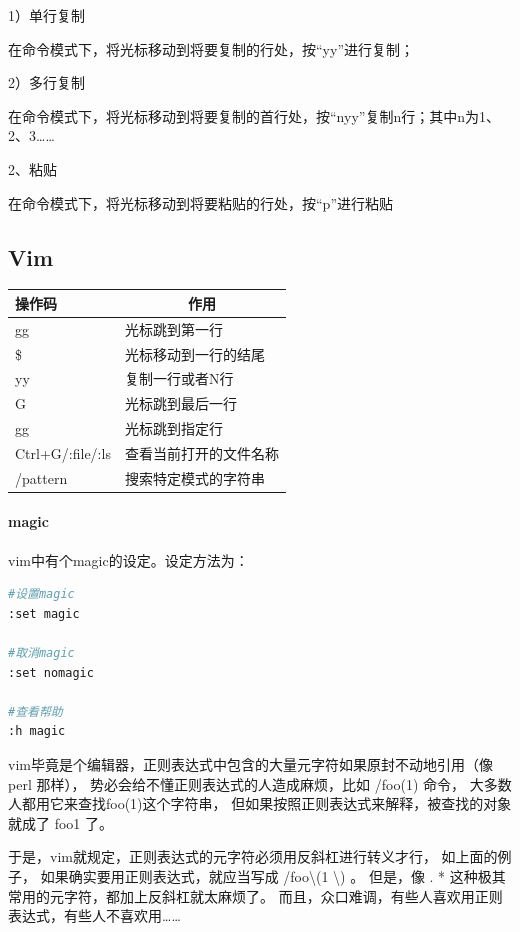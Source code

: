 \documentclass{book}
\begin{document}
1）单行复制

在命令模式下，将光标移动到将要复制的行处，按“yy”进行复制；

2）多行复制

在命令模式下，将光标移动到将要复制的首行处，按“nyy”复制n行；其中n为1、2、3……

2、粘贴

在命令模式下，将光标移动到将要粘贴的行处，按“p”进行粘贴

\subsection{Vim}

\begin{tabular}{l|p{10cm}}
	\multirow{1}{*}{操作码}			
	& \multicolumn{1}{c}{作用}\\	 
	\hline
	gg & 光标跳到第一行\\
	\hline
	\$ & 光标移动到一行的结尾\\
	\hline
	[N]yy & 复制一行或者N行\\
	\hline
	G & 光标跳到最后一行\\
	\hline
	[n]gg & 光标跳到指定行\\
	\hline
	Ctrl+G/:file/:ls & 查看当前打开的文件名称\\
	\hline
	/pattern & 搜索特定模式的字符串\\
	\hline
\end{tabular}

\paragraph{magic}vim中有个magic的设定。设定方法为：

\begin{lstlisting}[language=Bash]
#设置magic
:set magic

#取消magic
:set nomagic

#查看帮助
:h magic
\end{lstlisting}

vim毕竟是个编辑器，正则表达式中包含的大量元字符如果原封不动地引用（像perl 那样）， 势必会给不懂正则表达式的人造成麻烦，比如 /foo(1) 命令， 大多数人都用它来查找foo(1)这个字符串， 但如果按照正则表达式来解释，被查找的对象就成了 foo1 了。

于是，vim就规定，正则表达式的元字符必须用反斜杠进行转义才行， 如上面的例子，
如果确实要用正则表达式，就应当写成 /foo\textbackslash (1 \textbackslash) 。 
但是，像 . * 这种极其常用的元字符，都加上反斜杠就太麻烦了。 
而且，众口难调，有些人喜欢用正则表达式，有些人不喜欢用……
\end{document}
